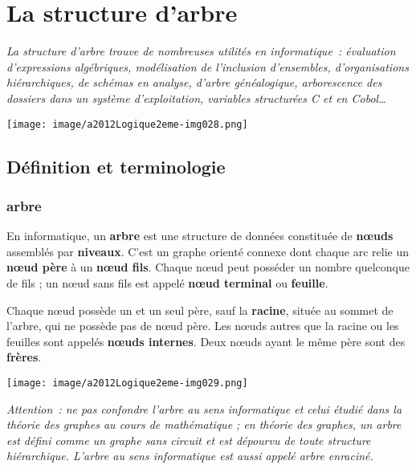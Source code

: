 \chapter{La structure d'arbre}

{\itshape La structure d'arbre trouve de nombreuses utilités en informatique~: 
évaluation d'expressions algébriques, modélisation de l'inclusion d'ensembles,
d'organisations hiérarchiques, de schémas en analyse, d'arbre généalogique, 
arborescence des dossiers dans un système d'exploitation, variables 
structurées C et en Cobol{\dots}}
\begin{center}
	\texttt{[image: image/a2012Logique2eme-img028.png]}
\end{center}
	

\section{Définition et terminologie}

	\subsection{arbre}
		En informatique, un \textbf{arbre} est une structure de données 
		constituée de \textbf{n{\oe}uds} assemblés par \textbf{niveaux}. 
		C'est un graphe orienté connexe dont chaque arc relie un 
		\textbf{n{\oe}ud père} à un \textbf{n{\oe}ud fils}. 
		Chaque n{\oe}ud peut posséder un nombre quelconque de fils ; 
		un n{\oe}ud sans fils est appelé \textbf{n{\oe}ud terminal} 
		ou \textbf{feuille}.

		Chaque n{\oe}ud possède un et un seul père, sauf la \textbf{racine}, 
		située au sommet de l'arbre, qui ne possède pas de n{\oe}ud père. 
		Les n{\oe}uds autres que la racine ou les feuilles sont appelés 
		\textbf{n{\oe}uds internes}. Deux n{\oe}uds ayant le même père 
		sont des \textbf{frères}.

		\begin{center}
		\texttt{[image: image/a2012Logique2eme-img029.png]} 
		\end{center}
		
		\textit{Attention~: ne pas confondre l'arbre au sens informatique 
		et celui étudié dans la théorie des graphes au cours de mathématique ; 
		en théorie des graphes, un arbre est défini comme un graphe sans 
		circuit et est dépourvu de toute structure hiérarchique. L'arbre au sens
		informatique est aussi appelé arbre enraciné.}


